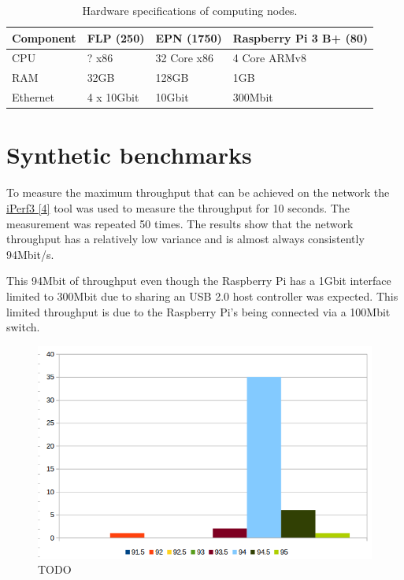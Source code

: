 \documentclass[]{article}
\begin{document}
\begin{table}[H]
	\begin{center}
		\begin{tabular}{ | l | l | l | l | }
			\hline
			\textbf{Component} & \textbf{FLP (250)} & \textbf{EPN (1750)} & \textbf{Raspberry Pi 3 B+ (80)} \\ \hline
			
			CPU & ? x86 & 32 Core x86 & 4 Core ARMv8 \\ \hline
			RAM & 32GB & 128GB & 1GB \\ \hline
			Ethernet & 4 x 10Gbit & 10Gbit & 300Mbit \\ \hline
		\end{tabular}
		\caption{Hardware specifications of computing nodes.}
		\label{tab:specs}
	\end{center}
\end{table}


\section{Synthetic benchmarks}
To measure the maximum throughput that can be achieved on the network the \hyperref[sec:ref04]{iPerf3 [4]} tool was used to measure the throughput for 10 seconds. The measurement was repeated 50 times. The results show that the network throughput has a relatively low variance and is almost always consistently 94Mbit/s.

This 94Mbit of throughput even though the Raspberry Pi has a 1Gbit interface limited to 300Mbit due to sharing an USB 2.0 host controller was expected. This limited throughput is due to the Raspberry Pi’s being connected via a 100Mbit switch.

\begin{center}
	\begin{figure}[H]
		\includegraphics[width=\textwidth]{network-benchmark}
		\caption{TODO}
		\label{fig:ssh}
	\end{figure}
\end{center}
\end{document}
